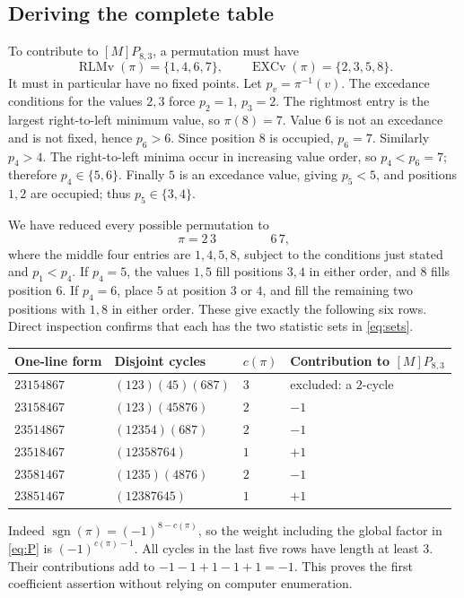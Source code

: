 \documentclass[11pt]{article}
\newcommand{\RLM}{\operatorname{RLMv}}
\newcommand{\EXC}{\operatorname{EXCv}}
\begin{document}
\subsection*{Deriving the complete table}
To contribute to $[M]P_{8,3}$, a permutation must have
\begin{equation}\label{eq:sets}
 \RLM(\pi)=\{1,4,6,7\},\qquad \EXC(\pi)=\{2,3,5,8\}.
\end{equation}
It must in particular have no fixed points. Let $p_v=\pi^{-1}(v)$.
The excedance conditions for the values $2,3$ force $p_2=1$, $p_3=2$.
The rightmost entry is the largest right-to-left minimum value, so
$\pi(8)=7$. Value $6$ is not an excedance and is not fixed, hence
$p_6>6$. Since position $8$ is occupied, $p_6=7$.
Similarly $p_4>4$. The right-to-left minima occur in increasing
value order, so $p_4<p_6=7$; therefore $p_4\in\{5,6\}$.
Finally $5$ is an excedance value, giving $p_5<5$, and positions
$1,2$ are occupied; thus $p_5\in\{3,4\}$.

We have reduced every possible permutation to
\[
 \pi=2\,3\,\boxed{\quad\quad\quad\quad}\,6\,7,
\]
where the middle four entries are $1,4,5,8$, subject to the conditions
just stated and $p_1<p_4$.
If $p_4=5$, the values $1,5$ fill positions $3,4$ in either order,
and $8$ fills position $6$. If $p_4=6$, place $5$ at position $3$
or $4$, and fill the remaining two positions with $1,8$ in either
order. These give exactly the following six rows. Direct inspection
confirms that each has the two statistic sets in \eqref{eq:sets}.

\begin{center}
\begin{tabular}{llll}
\toprule
One-line form & Disjoint cycles & $c(\pi)$ & Contribution to $[M]P_{8,3}$\\
\midrule
$23154867$ & $(123)(45)(687)$ & $3$ & excluded: a $2$-cycle\\
$23158467$ & $(123)(45876)$ & $2$ & $-1$\\
$23514867$ & $(12354)(687)$ & $2$ & $-1$\\
$23518467$ & $(12358764)$ & $1$ & $+1$\\
$23581467$ & $(1235)(4876)$ & $2$ & $-1$\\
$23851467$ & $(12387645)$ & $1$ & $+1$\\
\bottomrule
\end{tabular}
\end{center}
Indeed $\operatorname{sgn}(\pi)=(-1)^{8-c(\pi)}$, so the weight
including the global factor in \eqref{eq:P} is $(-1)^{c(\pi)-1}$.
All cycles in the last five rows have length at least $3$.
Their contributions add to $-1-1+1-1+1=-1$. This proves the first
coefficient assertion without relying on computer enumeration.
\end{document}
